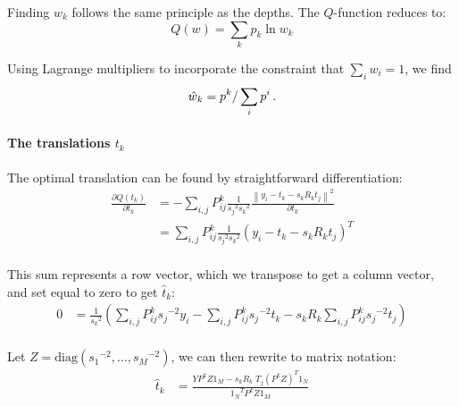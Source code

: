 Finding $w_k$ follows the same principle as the depths. The $Q$-function reduces to:
\[
Q(w) = \sum_{k} p_k \ln w_k
\]

Using Lagrange multipliers to incorporate the constraint that $\sum_i w_i = 1$, we find
\[
\hat w_k = p^k / \sum_{i} p^i \,\text{.}
\]

\paragraph{The translations $t_k$} The optimal translation can be found by straightforward differentiation:
\begin{align*}
\frac{\partial Q(t_k)}{\partial t_k} &= 
- \sum_{i,j} P_{ij}^k \frac{1}{{s_j}^2{s_k}^2}\frac{\left \|  y_i - t_k - s_kR_kt_j \right\|^2}{\partial t_k}
\\
&= \sum_{i,j} P_{ij}^k \frac{1}{{s_j}^2{s_k}^2} \left(y_i - t_k - s_kR_kt_j\right)^T \\
\end{align*}

This sum represents a row vector, which we transpose to get a column vector, and set equal to zero to get $\hat t_k$:
\begin{align*}
0 &= \frac{1} {{s_k}^2} \left (\sum_{i,j} P^k_{ij} {s_j}^{-2} y_i  - \sum_{i,j} P^k_{ij} {s_j}^{-2} t_k - s_kR_k \sum_{i,j} P^k_{ij} {s_j}^{-2} t_j\right) \\
\end{align*}

Let $Z = \text{diag}({s_1}^{-2}, \ldots, {s_M}^{-2})$, we can then rewrite to matrix notation:
\begin{align*}
\hat t_k &= \frac{YP^kZ1_M - s_kR_k\;T_j(P^kZ)^T1_N}{{1_N}^TP^kZ1_M} 
\end{align*} 

